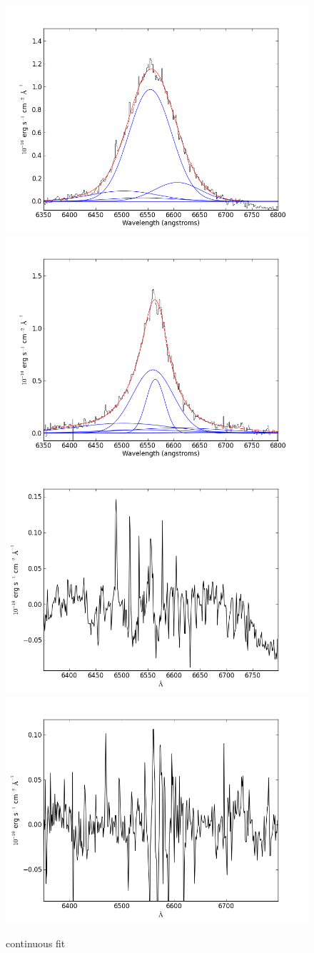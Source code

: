 \documentclass[usenatbib]{mn2e}
\begin{document}
\newpage


\begin{figure}
\begin{center}
\includegraphics[width=0.46\linewidth,angle=0]{Halpha_4.png}
\vspace{5mm}
\includegraphics[width=0.49\linewidth,angle=0]{Halpha_5.png}\\
\includegraphics[width=0.46\linewidth,angle=0]{Halpha_res_4.png}
\hspace{5mm}
\includegraphics[width=0.49\linewidth,angle=0]{Halpha_res_5.png}\\
\end{center} 
\caption{continuous fit \label{fig:landscape}}   
\end{figure}
\end{document}
